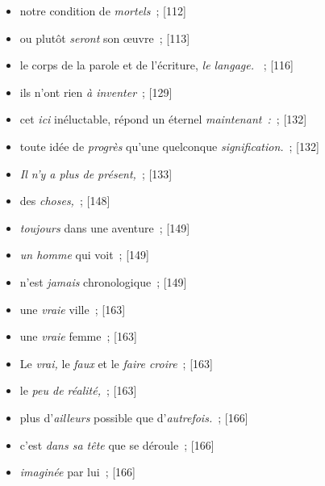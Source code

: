 \documentclass[12pt, a4paper]{article}
\begin{document}
\begin{itemize}
	\item notre condition de \textit{mortels}{\color{gray}~; [112]}

	\item ou plutôt \textit{seront} son œuvre{\color{gray}~; [113]}

	\item le corps de la parole et de l’écriture, \textit{le langage. }{\color{gray}~; [116]}

	\item ils n’ont rien \textit{à inventer}{\color{gray}~; [129]}

	\item cet \textit{ici} inéluctable, répond un éternel \textit{maintenant~:}{\color{gray}~; [132]}

	\item toute idée de \textit{progrès} qu’une quelconque \textit{signification.}{\color{gray}~; [132]}

	\item \textit{Il n’y a plus de présent,}{\color{gray}~; [133]}

	\item des \textit{choses,}{\color{gray}~; [148]}

	\item \textit{toujours} dans une aventure{\color{gray}~; [149]}

	\item \textit{un homme} qui voit{\color{gray}~; [149]}

	\item n’est \textit{jamais} chronologique{\color{gray}~; [149]}

	\item une \textit{vraie} ville{\color{gray}~; [163]}

	\item une \textit{vraie} femme{\color{gray}~; [163]}

	\item  Le \textit{vrai,} le \textit{faux} et le \textit{faire croire}{\color{gray}~; [163]}

	\item le \textit{peu de réalité,}{\color{gray}~; [163]}

	\item plus d’\textit{ailleurs} possible que d’\textit{autrefois.}{\color{gray}~; [166]}

	\item c’est \textit{dans sa tête} que se déroule{\color{gray}~; [166]}

	\item \textit{imaginée }par lui{\color{gray}~; [166]}


\end{itemize}
\end{document}
